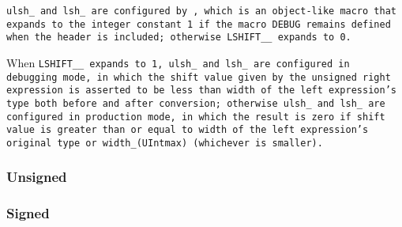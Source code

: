 \def\Subsubsection#1{\subsubsection{#1}
}

\tt{ulsh_} and \tt{lsh_} are configured by ,
which is an object-like macro that expands to the integer constant
\tt{1} if the macro \tt{DEBUG} remains defined when the header
 is included; otherwise \tt{LSHIFT__} expands to \tt{0}.

When \tt{LSHIFT__} expands to \tt{1}, \tt{ulsh_}
and \tt{lsh_} are configured in debugging mode, in
which the shift value given by the unsigned right expression is asserted to be
less than width of the left expression's type both before and after conversion;
otherwise \tt{ulsh_} and \tt{lsh_} are configured in production mode, in which
the result is zero if shift value is greater than or equal to width of the left
expression's original type or \tt{width_(UIntmax)} (whichever is smaller).

\Subsubsection{Unsigned}

\Subsubsection{Signed}
